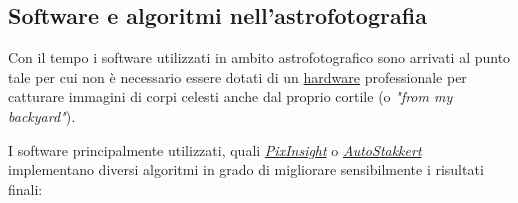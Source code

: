 \subsection{Software e algoritmi nell'astrofotografia} \label{subsec:software}

Con il tempo i software utilizzati in ambito astrofotografico sono arrivati al punto tale per cui non è necessario essere dotati di un \hyperref[subsec:hardware]{hardware} professionale per catturare immagini di corpi celesti anche dal proprio cortile (o \textit{"from my backyard"}).

I software principalmente utilizzati, quali \href{https://pixinsight.com/}{\textit{PixInsight}} o \href{https://www.autostakkert.com/}{\textit{AutoStakkert}} implementano diversi algoritmi in grado di migliorare sensibilmente i risultati finali:

